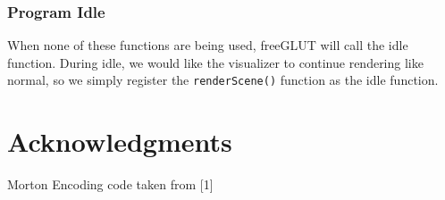 \documentclass[fleqn,10pt]{UserGuideArx} %
\begin{document}
\subsubsection{Program Idle}
    When none of these functions are being used, freeGLUT will call the idle function. During idle, we would like the visualizer to continue rendering like normal, so we simply register the \texttt{renderScene()} function as the idle function.\\




\section*{Acknowledgments} %
Morton Encoding code taken from [1]



\end{document}
